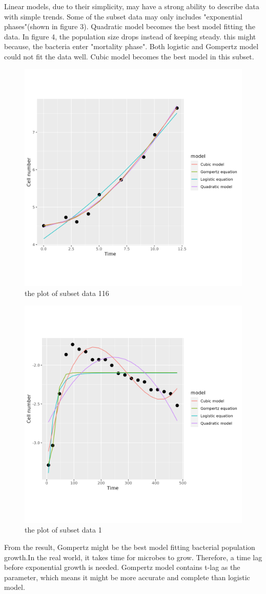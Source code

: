 \documentclass{article}
\begin{document}
Linear models, due to their simplicity, may have a strong ability to describe data with simple trends. Some of the subset data may only includes "exponential phases"(shown in figure 3). Quadratic model becomes the best model fitting the data. In figure 4, the population size drops instead of keeping steady. this might because, the bacteria enter "mortality phase". Both logistic and Gompertz model could not fit the data well. Cubic model becomes the best model in this subset.
\begin{figure}
    \centering
    \includegraphics[width=0.5\linewidth]{../results/subset_ 116 _plot.png}
    \caption{the plot of subset data 116}
    \label{fig:enter-label}
\end{figure}

\begin{figure}
  \centering
    \includegraphics[width=0.5\linewidth]{../results/subset_ 1 _plot.png}
    \caption{the plot of subset data 1 }
    \label{fig:enter-label}
\end{figure}

From the result, Gompertz might be the best model fitting bacterial population growth.In the real world, it takes time for microbes to grow. Therefore, a time lag before exponential growth is needed. Gompertz model contains t-lag as the parameter, which means it might be more accurate and complete than logistic model. 
\end{document}
